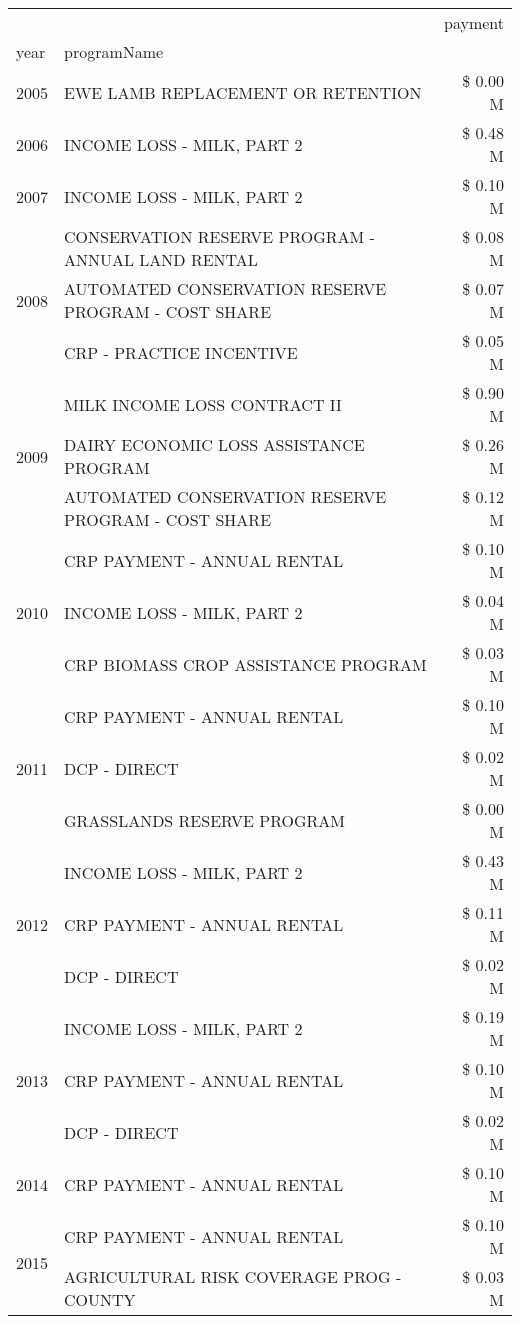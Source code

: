 \begin{tabular}{llr}
\toprule
 &  & payment \\
year & programName &  \\
\midrule
2005 & EWE LAMB REPLACEMENT OR RETENTION & \$ 0.00 M \\
\cline{1-3}
2006 & INCOME LOSS - MILK, PART 2 & \$ 0.48 M \\
\cline{1-3}
2007 & INCOME LOSS - MILK, PART 2 & \$ 0.10 M \\
\cline{1-3}
\multirow[t]{3}{*}{2008} & CONSERVATION RESERVE PROGRAM - ANNUAL LAND RENTAL & \$ 0.08 M \\
 & AUTOMATED CONSERVATION RESERVE PROGRAM - COST SHARE & \$ 0.07 M \\
 & CRP - PRACTICE INCENTIVE & \$ 0.05 M \\
\cline{1-3}
\multirow[t]{3}{*}{2009} & MILK INCOME LOSS CONTRACT II & \$ 0.90 M \\
 & DAIRY ECONOMIC LOSS ASSISTANCE PROGRAM & \$ 0.26 M \\
 & AUTOMATED CONSERVATION RESERVE PROGRAM - COST SHARE & \$ 0.12 M \\
\cline{1-3}
\multirow[t]{3}{*}{2010} & CRP PAYMENT - ANNUAL RENTAL & \$ 0.10 M \\
 & INCOME LOSS - MILK, PART 2 & \$ 0.04 M \\
 & CRP BIOMASS CROP ASSISTANCE PROGRAM & \$ 0.03 M \\
\cline{1-3}
\multirow[t]{3}{*}{2011} & CRP PAYMENT - ANNUAL RENTAL & \$ 0.10 M \\
 & DCP - DIRECT & \$ 0.02 M \\
 & GRASSLANDS RESERVE PROGRAM & \$ 0.00 M \\
\cline{1-3}
\multirow[t]{3}{*}{2012} & INCOME LOSS - MILK, PART 2 & \$ 0.43 M \\
 & CRP PAYMENT - ANNUAL RENTAL & \$ 0.11 M \\
 & DCP - DIRECT & \$ 0.02 M \\
\cline{1-3}
\multirow[t]{3}{*}{2013} & INCOME LOSS - MILK, PART 2 & \$ 0.19 M \\
 & CRP PAYMENT - ANNUAL RENTAL & \$ 0.10 M \\
 & DCP - DIRECT & \$ 0.02 M \\
\cline{1-3}
2014 & CRP PAYMENT - ANNUAL RENTAL & \$ 0.10 M \\
\cline{1-3}
\multirow[t]{2}{*}{2015} & CRP PAYMENT - ANNUAL RENTAL & \$ 0.10 M \\
 & AGRICULTURAL RISK COVERAGE PROG - COUNTY & \$ 0.03 M \\

\end{tabular}

